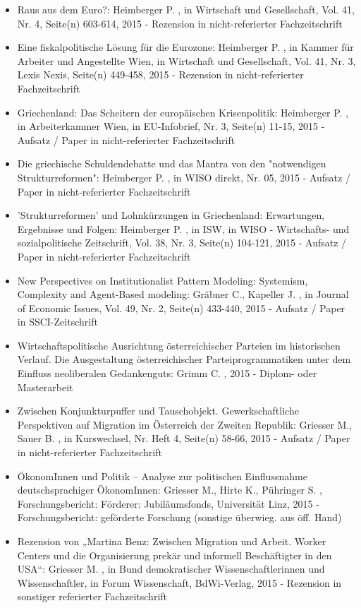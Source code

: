 \begin{itemize}
	 \item Raus aus dem Euro?: Heimberger P. , in Wirtschaft und Gesellschaft, Vol. 41, Nr. 4, Seite(n) 603-614, 2015 - Rezension in nicht-referierter Fachzeitschrift
	 \item Eine fiskalpolitische Lösung für die Eurozone: Heimberger P. , in Kammer für Arbeiter und Angestellte Wien, in Wirtschaft und Gesellschaft, Vol. 41, Nr. 3, Lexis Nexis, Seite(n) 449-458, 2015 - Rezension in nicht-referierter Fachzeitschrift
	 \item Griechenland: Das Scheitern der europäischen Krisenpolitik: Heimberger P. , in Arbeiterkammer Wien, in EU-Infobrief, Nr. 3, Seite(n) 11-15, 2015 - Aufsatz / Paper in nicht-referierter Fachzeitschrift
	 \item Die griechische Schuldendebatte und das Mantra von den "notwendigen Strukturreformen": Heimberger P. , in WISO direkt, Nr. 05, 2015 - Aufsatz / Paper in nicht-referierter Fachzeitschrift
	 \item 'Strukturreformen' und Lohnkürzungen in Griechenland: Erwartungen, Ergebnisse und Folgen: Heimberger P. , in ISW, in WISO - Wirtschafts- und sozialpolitische Zeitschrift, Vol. 38, Nr. 3, Seite(n) 104-121, 2015 - Aufsatz / Paper in nicht-referierter Fachzeitschrift
	 \item New Perspectives on  Institutionalist Pattern Modeling: Systemism, Complexity and  Agent-Based modeling: Gräbner C., Kapeller J. , in Journal of Economic Issues, Vol. 49, Nr. 2, Seite(n) 433-440, 2015 - Aufsatz / Paper in SSCI-Zeitschrift
	 \item Wirtschaftspolitische Ausrichtung österreichischer Parteien im historischen Verlauf. Die Ausgestaltung österreichischer Parteiprogrammatiken unter dem Einfluss neoliberalen Gedankenguts: Grimm C. , 2015 - Diplom- oder Masterarbeit
	 \item Zwischen Konjunkturpuffer und Tauschobjekt. Gewerkschaftliche Perspektiven auf Migration im Österreich der Zweiten Republik: Griesser M., Sauer B. , in Kurswechsel, Nr. Heft 4, Seite(n) 58-66, 2015 - Aufsatz / Paper in nicht-referierter Fachzeitschrift
	 \item ÖkonomInnen und Politik – Analyse zur politischen Einflussnahme deutschsprachiger ÖkonomInnen: Griesser M., Hirte K., Pühringer S. , Forschungsbericht: Förderer: Jubiläumsfonds, Universität Linz, 2015 - Forschungsbericht: geförderte Forschung (sonstige überwieg. aus öff. Hand)
	 \item Rezension von „Martina Benz: Zwischen Migration und Arbeit. Worker Centers und die Organisierung prekär und informell Beschäftigter in den USA“: Griesser M. , in Bund demokratischer Wissenschaftlerinnen und Wissenschaftler, in Forum Wissenschaft, BdWi-Verlag, 2015 - Rezension in sonstiger referierter Fachzeitschrift

\end{itemize}

